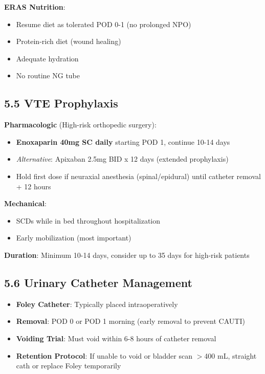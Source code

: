 \documentclass[11pt,letterpaper]{article}
\begin{document}
\textbf{ERAS Nutrition}:
\begin{itemize}[leftmargin=*]
    \item Resume diet as tolerated POD 0-1 (no prolonged NPO)
    \item Protein-rich diet (wound healing)
    \item Adequate hydration
    \item No routine NG tube
\end{itemize}

\subsection*{5.5 VTE Prophylaxis}

\textbf{Pharmacologic} (High-risk orthopedic surgery):
\begin{itemize}[leftmargin=*]
    \item \textbf{Enoxaparin 40mg SC daily} starting POD 1, continue 10-14 days
    \item \textit{Alternative}: Apixaban 2.5mg BID x 12 days (extended prophylaxis)
    \item Hold first dose if neuraxial anesthesia (spinal/epidural) until catheter removal + 12 hours
\end{itemize}

\textbf{Mechanical}:
\begin{itemize}[leftmargin=*]
    \item SCDs while in bed throughout hospitalization
    \item Early mobilization (most important)
\end{itemize}

\textbf{Duration}: Minimum 10-14 days, consider up to 35 days for high-risk patients

\subsection*{5.6 Urinary Catheter Management}

\begin{itemize}[leftmargin=*]
    \item \textbf{Foley Catheter}: Typically placed intraoperatively
    \item \textbf{Removal}: POD 0 or POD 1 morning (early removal to prevent CAUTI)
    \item \textbf{Voiding Trial}: Must void within 6-8 hours of catheter removal
    \item \textbf{Retention Protocol}: If unable to void or bladder scan $>$400 mL, straight cath or replace Foley temporarily
\end{itemize}
\end{document}
